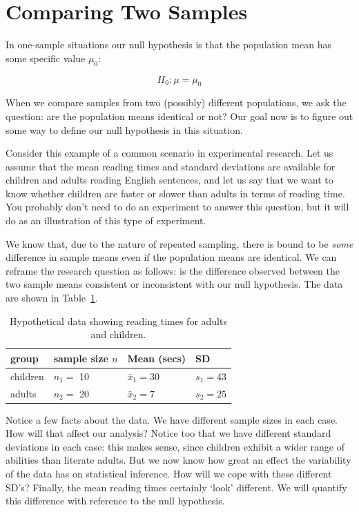 \documentclass[12pt]{book}\usepackage[]{graphicx}\usepackage[]{color}
\begin{document}
\section{Comparing Two Samples}

In one-sample situations our null hypothesis is that the population mean has some specific value $\mu_0$:

\begin{equation}
H_0: \mu=\mu_0
\end{equation}

When we compare samples from two (possibly) different populations, we ask the question: are the
population means identical or not? Our goal now is to
figure out some way to define our null hypothesis in this situation.

Consider this example of a common scenario in experimental research. Let us assume that the 
mean reading times and standard deviations are available 
for children and adults reading English sentences,  
and let us say that we want to know whether children are
faster or slower than adults in terms of reading time.
You probably don't need to do an experiment to answer this question,
but it will do as an illustration of this type of experiment.

We know that, due to the nature of repeated sampling,  
there is bound to be
\emph{some} difference in sample means even if the population means
are identical. We can reframe the research question as follows: is the
difference observed between the two sample means  
consistent or inconsistent with our null hypothesis.  The data are shown in Table~\ref{adultchilddata}.

\begin{table}
\begin{center}
\caption{Hypothetical data showing reading times for adults and children.}
\label{adultchilddata}       %
\begin{tabular}{p{2cm}p{3cm}p{3cm}p{3cm}}
group & sample size $n$ & Mean (secs) & SD \\
\hline
children & $n_1=$ 10 & $\bar{x}_1=30$ & $s_1=43$ \\
adults   & $n_2=$ 20 & $\bar{x}_2=7$ & $s_2=25$ \\
\end{tabular}
\end{center}
\end{table}

Notice a few facts about the data. We have different sample sizes in each case. How will that affect our analysis? Notice too that we have different standard deviations in each case: this makes sense, since children exhibit a wider range of abilities than literate adults. But we now know how great an effect the variability of the data has on statistical inference. How will we cope with these different SD's? Finally, the mean reading times certainly `look'  different. We will quantify this difference with reference to the null hypothesis.
\end{document}
